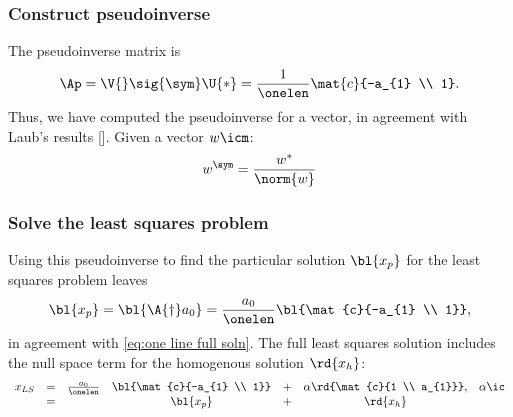 \subsubsection{Construct pseudoinverse}  %
The pseudoinverse matrix is
  \begin{equation*}   %
      \Ap = \V{} \sig{\sym} \U{*} = \frac{1} {\onelen} \mat{c}{-a_{1} \\ 1}.
  \end{equation*}
Thus, we have computed the pseudoinverse for a vector, in agreement with Laub's results \cite{Laub2005}[]. Given a vector $w\icm$:
  \begin{equation}   %
    w^{\sym} = \frac{w^{*}} {\norm{w}}
    \label{eq:vectorpi}
  \end{equation}

\subsubsection{Solve the least squares problem}  %
Using this pseudoinverse to find the particular solution $\bl{x_{p}}$ for the least squares problem leaves
  \begin{equation}   %
      \bl{x_{p}} = \bl{\A{\dagger} a_{0}} = \frac{a_{0}}{\onelen} \bl{\mat{c}{-a_{1} \\ 1}},
   \label{eq:one line soln}
  \end{equation}
in agreement with \eqref{eq:one line full soln}. The full least squares solution includes the null space term for the homogenous solution $\rd{x_{h}}$:
  \begin{equation}   %
   \begin{array}{ccccccl}
     x_{LS} 
     	 &=& \frac{a_{0}}{\onelen} & \bl{\mat{c}{-a_{1} \\ 1}} & + & \alpha \rd{\mat{c}{1 \\ a_{1}}}, & \alpha \ic \\
     	 &=& &\bl{x_{p}} & + & \rd{x_{h}}
   \end{array}
  \end{equation}

